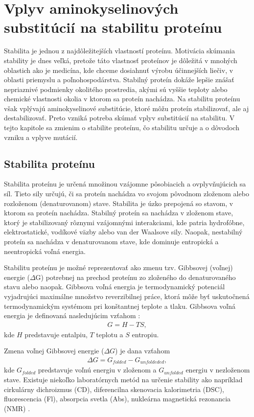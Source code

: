 \chapter{Vplyv aminokyselinových substitúcií na stabilitu proteínu}

Stabilita je jednou z najdôležitejších vlastností proteínu. Motivácia skúmania stability je dnes veľká, pretože táto vlastnosť proteínov je dôležitá v mnohých oblastich ako je medicína, kde chceme dosiahnuť výrobu účinnejších liečiv, v oblasti priemyslu a poľnohospodárstva. Stabilný proteín dokáže lepšie znášať nepriaznivé podmienky okolitého prostredia, akými sú vyššie teploty alebo chemické vlastnosti okolia v ktorom sa proteín nachádza. Na stabilitu proteínu však vplývajú aminokyselinové substitúcie, ktoré môžu proteín stabilizovať, ale aj destabilizovať. Preto vzniká potreba skúmať vplyv substitúcií na stabilitu. V tejto kapitole sa zmienim o stabilite proteínu, čo stabilitu určuje a o dôvodoch vzniku a vplyve mutácií.


\section{Stabilita proteínu}
Stabilita proteínu je určená množinou vzájomne pôsobiacich a ovplyvňujúcich sa síl. Tieto sily určujú, či sa proteín nachádza vo svojom pôvodnom zloženom alebo rozloženom (denaturovanom) stave. Stabilita je úzko prepojená so stavom, v ktorom sa proteín nachádza. Stabilný proteín sa nachádza v zloženom stave, ktorý je stabilizovaný rôznymi vzájomnými interakciami, kde patria hydrofóbne, elektrostatické, vodíkové väzby alebo van der Waalsove sily. Naopak, nestabilný proteín sa nachádza v denaturovanom stave, kde dominuje entropická a neentropická voľná energia. \cite{gromiha}

Stabilitu proteínu je možné reprezentovať ako zmenu tzv. Gibbsovej (voľnej) energie ($\Delta$G) potrebnej na prechod proteínu zo zloženého do denaturovaného stavu alebo naopak. 
Gibbsova voľná energia je termodynamický potenciál vyjadrujúci maximálne množstvo reverzibilnej práce, ktorá môže byť uskutočnená termodynamickým systémom pri konštantnej teplote a tlaku. Gibbsova voľná energia je definovaná nasledujúcim vzťahom \cite{gibbs}:
\begin{align}
	G = H - TS,
\end{align}
kde $H$ predstavuje entalpiu, $T$ teplotu a $S$ entropiu.

Zmena voľnej Gibbsovej energie ($\Delta G$) je dana vzťahom
\begin{align}
	\Delta G = G_{folded} - G_{unfoldeded},
\end{align}
kde $G_{folded}$ predstavuje voľnú energiu v zloženom a $G_{unfolded}$ energiu v nezloženom stave.
  Existuje niekoľko laboratórnych metód na určenie stability ako napríklad cirkulárny dichroizmus (CD), diferencilna skenovacia kalorimetria (DSC), fluorescencia (Fl), absorpcia svetla (Abs), nukleárna magnetická rezonancia (NMR) \cite{gromiha}.

